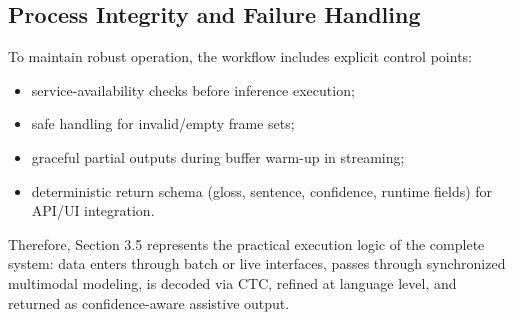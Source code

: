 \subsection{Process Integrity and Failure Handling}
To maintain robust operation, the workflow includes explicit control points:
\begin{itemize}[leftmargin=1.5em]
\item service-availability checks before inference execution;
\item safe handling for invalid/empty frame sets;
\item graceful partial outputs during buffer warm-up in streaming;
\item deterministic return schema (gloss, sentence, confidence, runtime fields) for API/UI integration.
\end{itemize}

Therefore, Section 3.5 represents the practical execution logic of the complete system: data enters through batch or live interfaces, passes through synchronized multimodal modeling, is decoded via CTC, refined at language level, and returned as confidence-aware assistive output.
